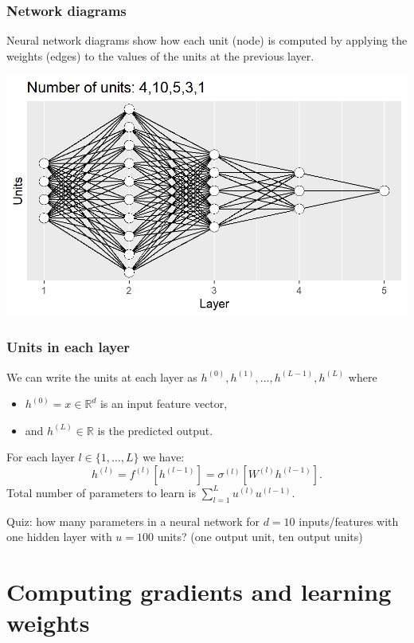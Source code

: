 \documentclass{beamer}
\begin{document}
\begin{frame}
  \frametitle{Network diagrams}
  Neural network
  diagrams show how each unit (node) is computed by applying the
  weights (edges) to the values of the units at the previous layer.

\includegraphics[width=\textwidth]{figure-architecture-fiveLayers}
\end{frame}

\begin{frame}
  \frametitle{Units in each layer}
We can write the units at each layer as
$h^{(0)},h^{(1)},\dots, h^{(L-1)}, h^{(L)}$ where
\begin{itemize}
\item $h^{(0)}=x\in\mathbb R^d$ is an input feature vector,
\item and
$h^{(L)}\in\mathbb R$ is the predicted output.
\end{itemize}
For
each layer $l\in \{1, \dots, L\}$ we have:
\begin{equation*}
  \label{eq:h_l}
  h^{(l)} = f^{(l)}\left[h^{(l-1)}\right] =
  \sigma^{(l)}\left[ W^{(l)} h^{(l-1)} \right].
\end{equation*}
Total number of parameters to learn is
$\sum_{l=1}^L u^{(l)} u^{(l-1)}.$

Quiz: how many parameters in a
neural network for $d=10$ inputs/features with one hidden layer with
$u=100$ units? (one output unit, ten output units)
\end{frame}

\section{Computing gradients and learning weights}
\end{document}
